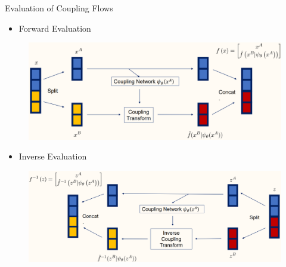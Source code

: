 \begin{frame}[allowframebreaks]

\begin{mydefinitionblock}{10.23}{Evaluation of Coupling Flows}
    \begin{itemize}
        \item Forward Evaluation
    \end{itemize}

    \begin{figure}[H]
        \centering
        \includegraphics[width=1.0\textwidth]{.././assets/10.12.png}
    \end{figure}

    \begin{itemize}
        \item Inverse Evaluation
    \end{itemize}

    \begin{figure}[H]
        \centering
        \includegraphics[width=1.0\textwidth]{.././assets/10.13.png}
    \end{figure}
\end{mydefinitionblock}

\end{frame}


